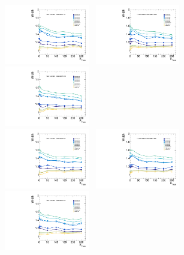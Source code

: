 \begin{figure}[!ht]
  \centering
  \includegraphics[width=0.33\textwidth]{Fig/BiasStudy/Linearity/ZJpsiG_Cat1/pull_width_linearity_TrueFunc0}~
  \includegraphics[width=0.33\textwidth]{Fig/BiasStudy/Linearity/ZJpsiG_Cat1/pull_width_linearity_TrueFunc1}~
  \includegraphics[width=0.33\textwidth]{Fig/BiasStudy/Linearity/ZJpsiG_Cat1/pull_width_linearity_TrueFunc2}\\
  \includegraphics[width=0.33\textwidth]{Fig/BiasStudy/Linearity/ZJpsiG_Cat1/pull_width_linearity_TrueFunc3}~
  \includegraphics[width=0.33\textwidth]{Fig/BiasStudy/Linearity/ZJpsiG_Cat1/pull_width_linearity_TrueFunc4}~
  \includegraphics[width=0.33\textwidth]{Fig/BiasStudy/Linearity/ZJpsiG_Cat1/pull_width_linearity_TrueFunc5}\\

\end{figure}
